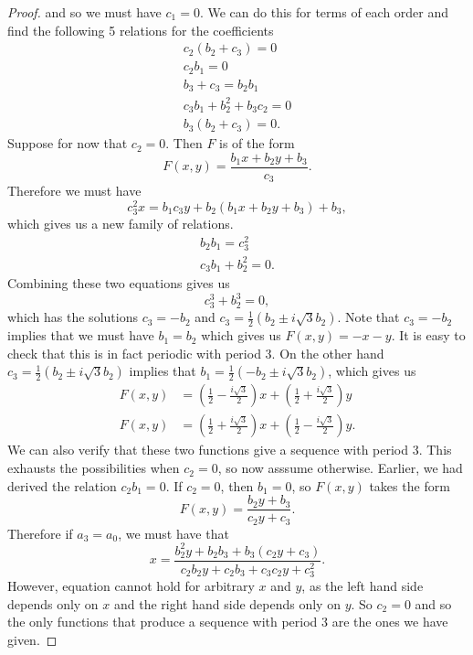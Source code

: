 \documentclass[12pt]{article}
\begin{document}
\begin{proof}
and so we must have $c_1=0$. We can do this for terms of each order and find the following 5 relations for the coefficients 
\begin{align*}
\label{fiverelations}
c_2(b_2 + c_3) =0 \\
c_2 b_1 = 0 \\
b_3 + c_3 = b_2 b_1 \\
c_3 b_1 + b_2^2 + b_3 c_2 =0 \\
b_3(b_2 + c_3) = 0. 
\end{align*}
Suppose for now that $c_2 =0$. Then $F$ is of the form 
\begin{equation*}
F(x,y) = \frac{ b_1 x + b_2 y + b_3}{c_3}.
\end{equation*}
Therefore we must have 
\begin{equation*}
c_3^2 x = b_1 c_3 y + b_2 (b_1 x + b_2 y + b_3) + b_3,
\end{equation*}
which gives us a new family of relations.
\begin{align*}
b_2 b_1 = c_3^2 \\
c_3 b_1 + b_2^2 =0.
\end{align*}
Combining these two equations gives us 
\begin{equation*}
c_3^3 + b_2^3 = 0, 
\end{equation*}
which has the solutions $c_3 = -b_2$ and $c_3 = \frac{1}{2} ( b_2 \pm i\sqrt{3}b_2)$. Note that $c_3 = -b_2$ implies that we must have $b_1=b_2$ which gives us $F(x,y) = -x -y$. It is easy to check that this is in fact periodic with period 3. On the other hand $c_3 = \frac{1}{2} ( b_2 \pm i\sqrt{3}b_2)$ implies that $b_1 = \frac{1}{2} ( -b_2 \pm i\sqrt{3}b_2)$, which gives us 
\begin{align*}
F(x,y) &= \left( \frac{1}{2} -\frac{i\sqrt{3}}{2} \right) x + \left( \frac{1}{2} +\frac{i\sqrt{3}}{2} \right) y \\
F(x,y) &= \left( \frac{1}{2} +\frac{i\sqrt{3}}{2} \right) x + \left( \frac{1}{2} -\frac{i\sqrt{3}}{2} \right) y.
\end{align*}
We can also verify that these two functions give a sequence with period 3. This exhausts the possibilities when $c_2=0$, so now asssume otherwise. Earlier, we had derived the relation $c_2b_1 = 0$. If $c_2 = 0$, then $b_1 = 0$, so $F(x,y)$ takes the form 
\begin{equation*}
F(x,y) = \frac{b_2 y + b_3}{c_2 y + c_3}.
\end{equation*}
Therefore if $a_3 = a_0$, we must have that 
\begin{equation*}
x = \frac{ b_2^2 y + b_2b_3 +b_3(c_2 y + c_3)}{c_2 b_2 y + c_2 b_3 + c_3 c_2 y + c_3^2}.
\end{equation*}
However, equation cannot hold for arbitrary $x$ and $y$, as the left hand side depends only on $x$ and the right hand side depends only on $y$. So $c_2=0$ and so the only functions that produce a sequence with period 3 are the ones we have given. 
\end{proof}
\end{document}
